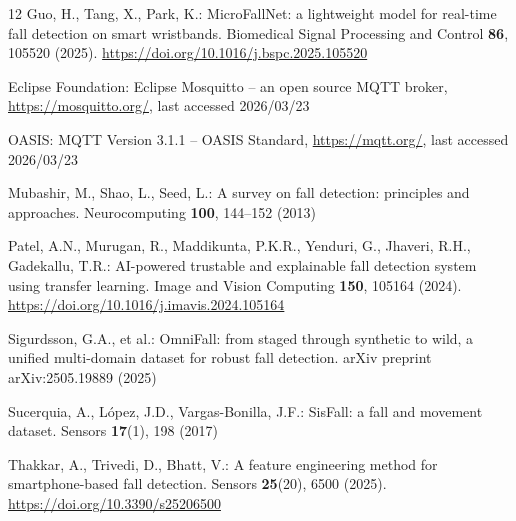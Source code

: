 \documentclass[runningheads]{llncs}
\providecommand{\doi}[1]{\url{https://doi.org/#1}}
\begin{document}
\begin{thebibliography}{12}
Guo, H., Tang, X., Park, K.: MicroFallNet: a lightweight model for real-time fall detection on smart wristbands. Biomedical Signal Processing and Control \textbf{86}, 105520 (2025). \doi{10.1016/j.bspc.2025.105520}

Eclipse Foundation: Eclipse Mosquitto -- an open source MQTT broker, \url{https://mosquitto.org/}, last accessed 2026/03/23

OASIS: MQTT Version 3.1.1 -- OASIS Standard, \url{https://mqtt.org/}, last accessed 2026/03/23

Mubashir, M., Shao, L., Seed, L.: A survey on fall detection: principles and approaches. Neurocomputing \textbf{100}, 144--152 (2013)

Patel, A.N., Murugan, R., Maddikunta, P.K.R., Yenduri, G., Jhaveri, R.H., Gadekallu, T.R.: AI-powered trustable and explainable fall detection system using transfer learning. Image and Vision Computing \textbf{150}, 105164 (2024). \doi{10.1016/j.imavis.2024.105164}

Sigurdsson, G.A., et al.: OmniFall: from staged through synthetic to wild, a unified multi-domain dataset for robust fall detection. arXiv preprint arXiv:2505.19889 (2025)

Sucerquia, A., L\'{o}pez, J.D., Vargas-Bonilla, J.F.: SisFall: a fall and movement dataset. Sensors \textbf{17}(1), 198 (2017)

Thakkar, A., Trivedi, D., Bhatt, V.: A feature engineering method for smartphone-based fall detection. Sensors \textbf{25}(20), 6500 (2025). \doi{10.3390/s25206500}

\end{thebibliography}
\end{document}
